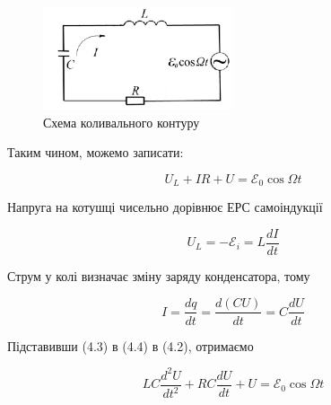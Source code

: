 \documentclass[12pt,a4paper]{article}
\begin{document}
    \begin{figure}[h!]

        \renewcommand{\thefigure}{4.\arabic{figure}} %

        \centering
        \includegraphics[width=0.5\textwidth]{4.2.png}
        \caption{Схема коливального контуру}
        \label{fig2:schema}

    \end{figure}

    Таким чином, можемо записати:

    \begin{equation}
        U_L + IR + U = \mathcal{E}_0 \cos \Omega t
        \tag{4.2}
    \end{equation}

    Напруга на котушці чисельно дорівнює ЕРС самоіндукції

    \begin{equation}
        U_L = -\mathcal{E}_i = L \frac{dI}{dt}
        \tag{4.3}
    \end{equation}

    Струм у колі визначає зміну заряду конденсатора, тому

    \vspace{0.5em}

    \begin{equation}
        I = \frac{dq}{dt} = \frac{d(CU)}{dt} = C \frac{dU}{dt}
        \tag{4.4}
    \end{equation}

    \vspace{0.5em}

    Підставивши (4.3) в (4.4) в (4.2), отримаємо

    \vspace{0.5em}

    \begin{equation}
        LC \frac{d^2U}{dt^2} + RC \frac{dU}{dt} + U = \mathcal{E}_0 \cos \Omega t
        \tag{4.5}
    \end{equation}
\end{document}
